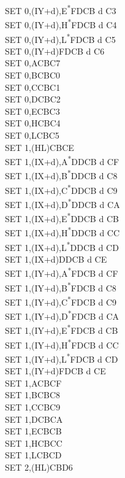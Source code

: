 \documentclass[twoside,openright,a4paper]{book}
\begin{document}
\begin{multicols}{3}
{\begin{tabbing}
	SET 0,(IY+d),E\textsuperscript{*}\>FDCB d C3\\
	SET 0,(IY+d),H\textsuperscript{*}\>FDCB d C4\\
	SET 0,(IY+d),L\textsuperscript{*}\>FDCB d C5\\
	SET 0,(IY+d)\>FDCB d C6\\
	SET 0,A\>CBC7\\
	SET 0,B\>CBC0\\
	SET 0,C\>CBC1\\
	SET 0,D\>CBC2\\
	SET 0,E\>CBC3\\
	SET 0,H\>CBC4\\
	SET 0,L\>CBC5\\
	SET 1,(HL)\>CBCE\\
	SET 1,(IX+d),A\textsuperscript{*}\>DDCB d CF\\
	SET 1,(IX+d),B\textsuperscript{*}\>DDCB d C8\\
	SET 1,(IX+d),C\textsuperscript{*}\>DDCB d C9\\
	SET 1,(IX+d),D\textsuperscript{*}\>DDCB d CA\\
	SET 1,(IX+d),E\textsuperscript{*}\>DDCB d CB\\
	SET 1,(IX+d),H\textsuperscript{*}\>DDCB d CC\\
	SET 1,(IX+d),L\textsuperscript{*}\>DDCB d CD\\
	SET 1,(IX+d)\>DDCB d CE\\
	SET 1,(IY+d),A\textsuperscript{*}\>FDCB d CF\\
	SET 1,(IY+d),B\textsuperscript{*}\>FDCB d C8\\
	SET 1,(IY+d),C\textsuperscript{*}\>FDCB d C9\\
	SET 1,(IY+d),D\textsuperscript{*}\>FDCB d CA\\
	SET 1,(IY+d),E\textsuperscript{*}\>FDCB d CB\\
	SET 1,(IY+d),H\textsuperscript{*}\>FDCB d CC\\
	SET 1,(IY+d),L\textsuperscript{*}\>FDCB d CD\\
	SET 1,(IY+d)\>FDCB d CE\\
	SET 1,A\>CBCF\\
	SET 1,B\>CBC8\\
	SET 1,C\>CBC9\\
	SET 1,D\>CBCA\\
	SET 1,E\>CBCB\\
	SET 1,H\>CBCC\\
	SET 1,L\>CBCD\\
	SET 2,(HL)\>CBD6\\

\end{tabbing}}
\end{multicols}
\end{document}
